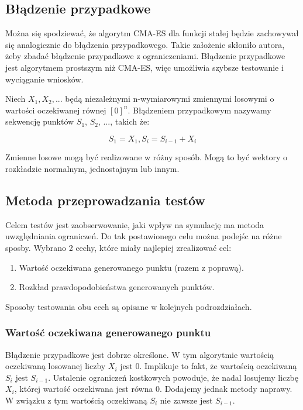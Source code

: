 \documentclass{mini}
\begin{document}
\subsection{Błądzenie przypadkowe} \label{bladzenie}

Można się spodziewać, że algorytm CMA-ES dla funkcji stałej będzie zachowywał się analogicznie do błądzenia przypadkowego. Takie założenie skłoniło autora, żeby zbadać błądzenie przypadkowe z ograniczeniami. Błądzenie przypadkowe jest algorytmem prostszym niż CMA-ES, więc umożliwia szybsze testowanie i wyciąganie wniosków.

Niech $ X_1, X_2, ... $ będą niezależnymi n-wymiarowymi zmiennymi losowymi o wartości oczekiwanej równej $ [0]^n $. Błądzeniem przypadkowym nazywamy sekwencję punktów $S_1$, $S_2$, ..., takich że:

\begin{equation}
S_1 = X_1, S_i=S_{i-1}+X_i
\end{equation}

Zmienne losowe mogą być realizowane w różny sposób. Mogą to być wektory o rozkładzie normalnym, jednostajnym lub innym.

\subsection{Metoda przeprowadzania testów}
Celem testów jest zaobserwowanie, jaki wpływ na symulację ma metoda uwzględniania ograniczeń. Do tak postawionego celu można podejśc na różne sposby. Wybrano 2 cechy, które miały najlepiej zrealizować cel:
\begin{enumerate}
\item Wartość oczekiwana generowanego punktu (razem z poprawą).
\item Rozkład prawdopodobieństwa generowanych punktów.
\end{enumerate}

Sposoby testowania obu cech są opisane w kolejnych podrozdziałach.

\subsubsection{Wartość oczekiwana generowanego punktu}
Błądzenie przypadkowe jest dobrze określone. W tym algorytmie wartością oczekiwaną losowanej liczby $X_i$ jest 0. Implikuje to fakt, że wartością oczekiwaną $S_i$ jest $S_{i-1}$. Ustalenie ograniczeń kostkowych powoduje, że nadal losujemy liczbę $X_i$, której wartość oczekiwana jest równa 0. Dodajemy jednak metody naprawy. W związku z tym wartością oczekiwaną $S_i$ nie zawsze jest $S_{i-1}$.
\end{document}
